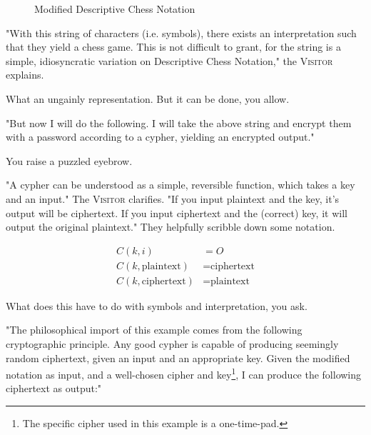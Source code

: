 \begin{figure}[H]
  \begin{center}
  \end{center}
  \caption{Modified Descriptive Chess Notation}
  \label{fig:DCN-mod}
\end{figure}

"With this string of characters (i.e. symbols), there exists an interpretation such that they yield a chess game. This is not difficult to grant, for the string is a simple, idiosyncratic variation on Descriptive Chess Notation," the \textsc{Visitor} explains.

What an ungainly representation. But it can be done, you allow.

"But now I will do the following. I will take the above string and encrypt them with a password according to a cypher, yielding an encrypted output."

You raise a puzzled eyebrow.

"A cypher can be understood as a simple, reversible function, which takes a key and an input." The \textsc{Visitor} clarifies. "If you input plaintext and the key, it's output will be ciphertext. If you input ciphertext and the (correct) key, it will output the original plaintext." They helpfully scribble down some notation.

\begin{align*}
  C(k, i) &= O \\
  C(k, \text{plaintext}) &= \text{ciphertext} \\
  C(k, \text{ciphertext}) &= \text{plaintext}
\end{align*}

What does this have to do with symbols and interpretation, you ask.

"The philosophical import of this example comes from the following cryptographic principle. Any good cypher is capable of producing seemingly random ciphertext, given an input and an appropriate key. Given the modified notation as input, and a well-chosen cipher and key\footnote{The specific cipher used in this example is a one-time-pad.}, I can produce the following ciphertext as output:"


